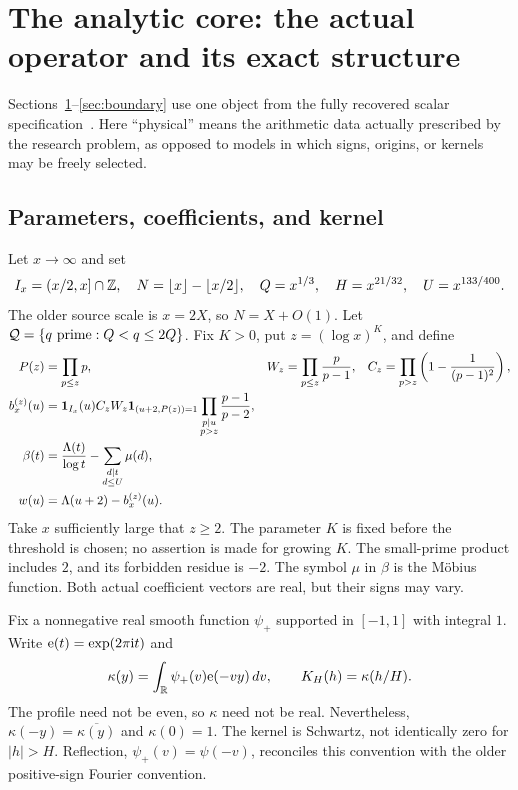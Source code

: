 \section{The analytic core: the actual operator and its exact structure}\label{sec:operator}
Sections~\ref{sec:operator}--\ref{sec:boundary} use one object from the fully recovered scalar specification~\cite{archivev59,archivephysical}. Here ``physical'' means the arithmetic data actually prescribed by the research problem, as opposed to models in which signs, origins, or kernels may be freely selected.

\subsection{Parameters, coefficients, and kernel}
Let $x\to\infty$ and set
\[
I_x=(x/2,x]\cap\mathbb Z,\quad N=\lfloor x\rfloor-\lfloor x/2\rfloor,\quad
Q=x^{1/3},\quad H=x^{21/32},\quad U=x^{133/400}.
\]
The older source scale is $x=2X$, so $N=X+O(1)$. Let $\mathcal Q=\{q\text{ prime}:Q<q\le2Q\}$. Fix $K>0$, put $z=(\log x)^K$, and define
\begin{align}
P(z)&=\prod_{p\le z}p,&W_z&=\prod_{p\le z}\frac p{p-1},&
C_z&=\prod_{p>z}\left(1-\frac1{(p-1)^2}\right),\nonumber\\
b_x^{(z)}(u)&=\mathbf 1_{I_x}(u)C_zW_z\mathbf 1_{(u+2,P(z))=1}
\prod_{\substack{p\mid u\\p>z}}\frac{p-1}{p-2},\label{eq:hybrid}\\
\beta(t)&=\frac{\Lambda(t)}{\log t}-\sum_{\substack{d\mid t\\d\le U}}\mu(d),\nonumber\\
w(u)&=\Lambda(u+2)-b_x^{(z)}(u).\label{eq:lanes}
\end{align}
Take $x$ sufficiently large that $z\ge2$. The parameter $K$ is fixed before the threshold is chosen; no assertion is made for growing $K$. The small-prime product includes $2$, and its forbidden residue is $-2$. The symbol $\mu$ in $\beta$ is the M\"obius function. Both actual coefficient vectors are real, but their signs may vary.

Fix a nonnegative real smooth function $\psi_+$ supported in $[-1,1]$ with integral $1$. Write $\mathrm e(t)=\exp(2\pi\mathrm i t)$ and
\[
\kappa(y)=\int_{\mathbb R}\psi_+(v)\mathrm e(-vy)\,dv,\qquad K_H(h)=\kappa(h/H).
\]
The profile need not be even, so $\kappa$ need not be real. Nevertheless, $\kappa(-y)=\overline{\kappa(y)}$ and $\kappa(0)=1$. The kernel is Schwartz, not identically zero for $|h|>H$. Reflection, $\psi_+(v)=\psi(-v)$, reconciles this convention with the older positive-sign Fourier convention.

